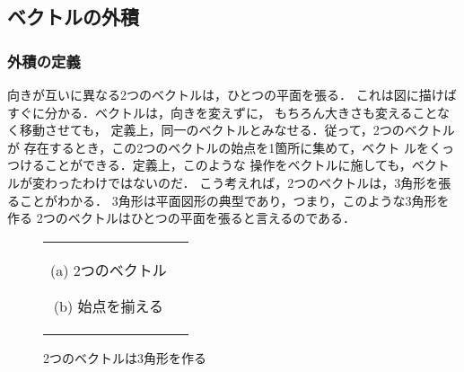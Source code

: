             \subsection{ベクトルの外積}\label{subsec:VecGaiseki}
                \subsubsection{外積の定義}
                向きが互いに異なる2つのベクトルは，ひとつの平面を張る．
                これは図に描けばすぐに分かる．ベクトルは，向きを変えずに，
                もちろん大きさも変えることなく移動させても，
                定義上，同一のベクトルとみなせる．従って，2つのベクトルが
                存在するとき，この2つのベクトルの始点を1箇所に集めて，ベクト
                ルをくっつけることができる．定義上，このような
                操作をベクトルに施しても，ベクトルが変わったわけではないのだ．
                こう考えれば，2つのベクトルは，3角形を張ることがわかる．
                3角形は平面図形の典型であり，つまり，このような3角形を作る
                2つのベクトルはひとつの平面を張ると言えるのである．
                    \begin{figure}[hbt]
                        \begin{tabular}{cc}
                            \begin{minipage}{0.5\hsize}
                                \begin{center}
                                    {v2vector01.pdf}

                                    (a) 2つのベクトル
                                    \label{fig:v2vector01}
                                \end{center}
                            \end{minipage}
                            \begin{minipage}{0.5\hsize}
                                \begin{center}
                                    {v2vector02.pdf}

                                    (b) 始点を揃える
                                    \label{fig:v2vector02}
                                \end{center}
                            \end{minipage}
                        \end{tabular}
                        \caption{2つのベクトルは3角形を作る}
                    \end{figure}


